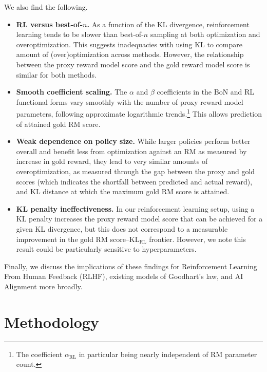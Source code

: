\documentclass{article}
\theoremstyle{plain}
\begin{document}
We also find the following.
\begin{itemize}
    \item \textbf{RL versus best-of-$n$.} As a function of the KL divergence, reinforcement learning tends to be slower than best-of-$n$ sampling at both optimization and overoptimization. This suggests inadequacies with using KL to compare amount of (over)optimization across methods. However, the relationship between the proxy reward model score and the gold reward model score is similar for both methods. 
    




    
    \item \textbf{Smooth coefficient scaling.} The $\alpha$ and $\beta$ coefficients in the BoN and RL functional forms vary smoothly with the number of proxy reward model parameters, following approximate logarithmic trends.\footnote{The coefficient $\alpha_{\text{RL}}$ in particular being nearly independent of RM parameter count.} This allows prediction of attained gold RM score.
    \item \textbf{Weak dependence on policy size.} While larger policies perform better overall and benefit less from optimization against an RM as measured by increase in gold reward, they lead to very similar amounts of overoptimization, as measured through the gap between the proxy and gold scores (which indicates the shortfall between predicted and actual reward), and KL distance at which the maximum gold RM score is attained.
    \item \textbf{KL penalty ineffectiveness.} In our reinforcement learning setup, using a KL penalty increases the proxy reward model score that can be achieved for a given KL divergence, but this does not correspond to a measurable improvement in the gold RM score--$\text{KL}_{\text{RL}}$ frontier. However, we note this result could be particularly sensitive to hyperparameters. 
\end{itemize}

Finally, we discuss the implications of these findings for Reinforcement Learning From Human Feedback (RLHF), existing models of Goodhart's law, and AI Alignment more broadly.





\section{Methodology}\label{methodology}
\end{document}
